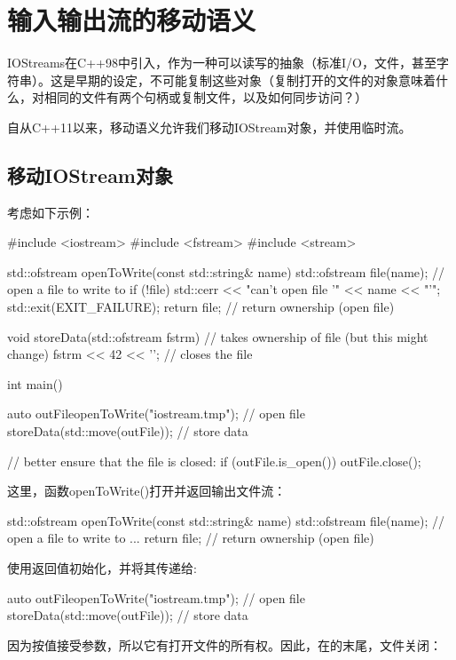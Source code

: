 \section{输入输出流的移动语义}
IOStreams在C++98中引入，作为一种可以读写的抽象（标准I/O，文件，甚至字符串）。这是早期的设定，不可能复制这些对象（复制打开的文件的对象意味着什么，对相同的文件有两个句柄或复制文件，以及如何同步访问？）

自从C++11以来，移动语义允许我们移动IOStream对象，并使用临时流。

\subsection{移动IOStream对象}

考虑如下示例：

\begin{cppcode}
#include <iostream>
#include <fstream>
#include <stream>

std::ofstream openToWrite(const std::string& name)
{
	std::ofstream file(name); // open a file to write to
	if (!file) {
		std::cerr << "can't open file '" << name << "'\n";
		std::exit(EXIT_FAILURE);
	}
	return file; // return ownership (open file)
}

void storeData(std::ofstream fstrm) // takes ownership of file (but this might change)
{
	fstrm << 42 << '\n';
} // closes the file

int main()
{
	auto outFile{openToWrite("iostream.tmp")}; // open file
	storeData(std::move(outFile)); // store data

	// better ensure that the file is closed:
	if (outFile.is_open()) {
		outFile.close();
	}
}
\end{cppcode}

这里，函数openToWrite()打开并返回输出文件流：

\begin{cppcode}
std::ofstream openToWrite(const std::string& name)
{
	std::ofstream file(name); // open a file to write to
	...
	return file; // return ownership (open file)
}
\end{cppcode}

使用返回值初始化，并将其传递给:

\begin{cppcode}
auto outFile{openToWrite("iostream.tmp")}; // open file
storeData(std::move(outFile)); // store data
\end{cppcode}

因为按值接受参数，所以它有打开文件的所有权。因此，在的末尾，文件关闭：

